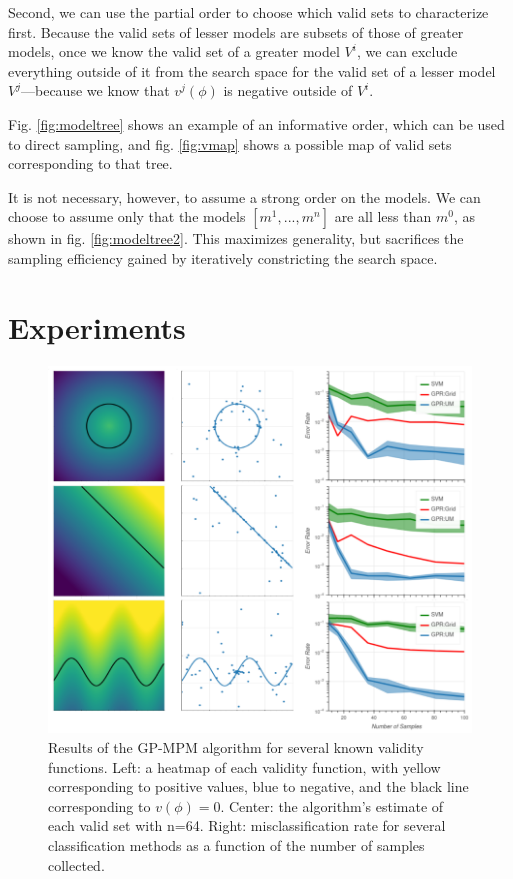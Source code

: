 \documentclass[12pt, conference]{IEEEtran}
\begin{document}
Second, we can use the partial order to choose which valid sets to characterize first. Because the valid sets of lesser models are subsets of those of greater models, once we know the valid set of a greater model $V^i$, we can exclude everything outside of it from the search space for the valid set of a lesser model $V^j$---because we know that $v^j(\phi)$ is negative outside of $V^i$.

Fig. \ref{fig:modeltree} shows an example of an informative order, which can be used to direct sampling, and fig. \ref{fig:vmap} shows a possible map of valid sets corresponding to that tree.

It is not necessary, however, to assume a strong order on the models. We can choose to assume only that the models $[m^1,...,m^n]$ are all less than $m^0$, as shown in fig. \ref{fig:modeltree2}. This maximizes generality, but sacrifices the sampling efficiency gained by iteratively constricting the search space.

\section{Experiments}

\begin{figure}[htbp]
    \centerline{\includegraphics[width=\textwidth]{img/multi_comp.png}}
    \caption{Results of the GP-MPM algorithm for several known validity functions. Left: a heatmap of each validity function, with yellow corresponding to positive values, blue to negative, and the black line corresponding to $v(\phi)=0$. Center: the algorithm's estimate of each valid set with n=64. Right: misclassification rate for several classification methods as a function of the number of samples collected.}
    \label{fig:multicomp}
\end{figure}
\end{document}
